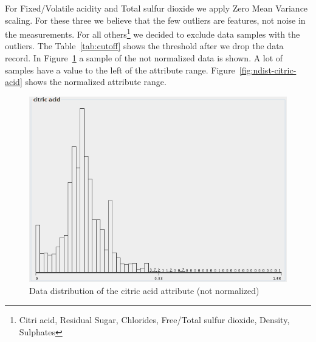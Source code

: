 \documentclass{acm_proc_article-sp}
\begin{document}

For Fixed/Volatile acidity and Total sulfur dioxide we apply Zero Mean Variance scaling. For these three we 
believe that the few outliers are features, not noise in the measurements.
For all others\footnote{Citri acid, Residual Sugar, Chlorides, Free/Total sulfur dioxide, Density, Sulphates}
we decided to exclude data samples with the outliers. The Table~\ref{tab:cutoff} shows the threshold after we drop
the data record. In Figure~\ref{fig:dist-citric-acid} a sample of the not normalized data is shown. A lot
of samples have a value to the left of the attribute range. Figure~\ref{fig:ndist-citric-acid} shows the
normalized attribute range.

\begin{figure}
\centering
\includegraphics[width=\linewidth]{img/dist-citric-acid}
\caption{Data distribution of the citric acid attribute (not normalized)}
\label{fig:dist-citric-acid}
\end{figure}
\end{document}
